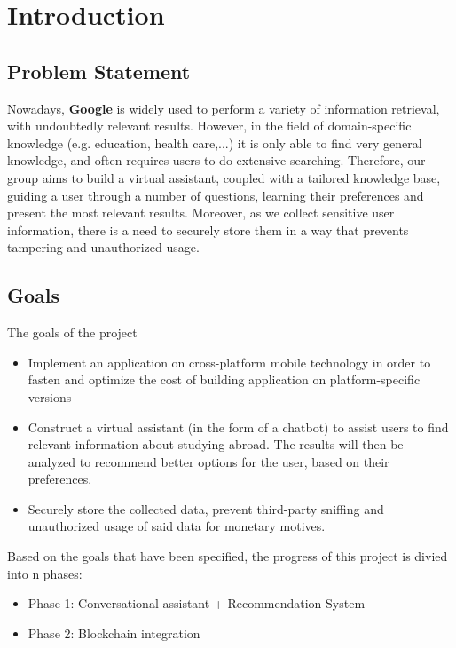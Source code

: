 
\chapter{Introduction}

\section{Problem Statement}
Nowadays, \textbf{Google} is widely used to perform a variety of information retrieval, with undoubtedly relevant results. However, in the field of domain-specific knowledge (e.g. education, health care,...) it is only able to find very general knowledge, and often requires users to do extensive searching. Therefore, our group aims to build a virtual assistant, coupled with a tailored knowledge base, guiding a user through a number of questions, learning their preferences and present the most relevant results. Moreover, as we collect sensitive user information, there is a need to securely store them in a way that prevents tampering and unauthorized usage.

\section{Goals}

The goals of the project
\begin{itemize}
    \item Implement an application on cross-platform mobile technology in order to fasten and optimize the cost of building application on platform-specific versions
    \item Construct a virtual assistant (in the form of a chatbot) to assist users to find relevant information about studying abroad. The results will then be analyzed to recommend better options for the user, based on their preferences.
    \item Securely store the collected data, prevent third-party sniffing and unauthorized usage of said data for monetary motives.
\end{itemize}
	

Based on the goals that have been specified, the progress of this project is divied into n phases:
\begin{itemize}
    \item Phase 1: Conversational assistant + Recommendation System
    \item Phase 2: Blockchain integration
\end{itemize}

